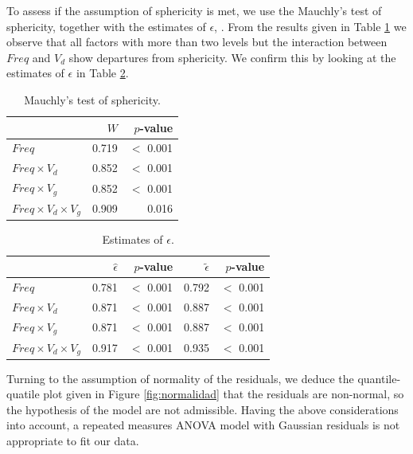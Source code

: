 \documentclass[sn-mathphys]{sn-jnl}%
\theoremstyle{thmstyleone}%
\theoremstyle{thmstyletwo}%
\theoremstyle{thmstylethree}%
\begin{document}
To assess if the assumption of sphericity is met, we use the Mauchly's test of sphericity, together with the estimates of $\epsilon$, \cite{BHN2000}. From the results given in Table \ref{fig:mauchyls} we observe that all factors with more than two levels but the interaction between $Freq$ and $V_d$ show departures from sphericity. We confirm this by looking at the estimates of $\epsilon$ in Table \ref{tab:epsilontable}. 

\begin{table}[!t]
	\centering
	\begin{tabular}{lrr}
		\hline
		& $W$ &  $p$-value \\ 
		\hline
		$Freq$ & 0.719 & $<$ 0.001 \\ 
		$Freq \times V_d$ & 0.852   & $<$ 0.001 \\ 
		$Freq \times V_g$ & 0.852   & $<$ 0.001 \\ 
		$Freq \times V_d \times V_g$ & 0.909  & 0.016 \\ 
		\hline
	\end{tabular}
		\caption{Mauchly's test of sphericity.} 
	\label{fig:mauchyls}
\end{table}


\begin{table}[!t]
	\centering
	\begin{tabular}{lrrrr}
		\hline
		& $\hat{\epsilon}$ & $p$-value &$\tilde{\epsilon}$&$p$-value \\ 
		\hline
		$ Freq$ & 0.781&$<$ 0.001  & 0.792 &$<$ 0.001 \\ 
		$Freq \times V_d$ & 0.871&$<$ 0.001  & 0.887&$<$ 0.001  \\ 
		$Freq \times V_g$ & 0.871&$<$ 0.001  & 0.887&$<$ 0.001  \\ 
		$Freq \times V_d \times V_g$ & 0.917&$<$ 0.001  & 0.935&$<$ 0.001  \\ 
		\hline
	\end{tabular}
	\caption{Estimates of $\epsilon$.} 
	\label{tab:epsilontable}
\end{table}

Turning to the assumption of normality of the residuals, we deduce the quantile-quatile plot given in Figure \ref{fig:normalidad} that the residuals are non-normal, so the hypothesis of the model are not admissible. Having the above considerations into account, a repeated measures ANOVA model with Gaussian residuals is not appropriate to fit our data. 
\end{document}
